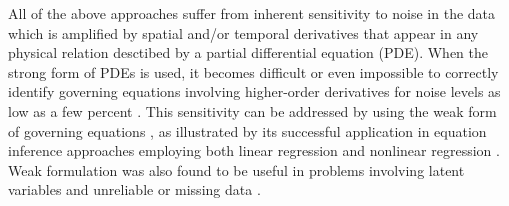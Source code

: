\documentclass[preprint]{article}
\begin{document}




All of the above approaches suffer from inherent sensitivity to noise in the data which is amplified by spatial and/or temporal derivatives that appear in any physical relation desctibed by a partial differential equation (PDE). When the strong form of PDEs is used, it becomes difficult or even impossible to correctly identify governing equations involving higher-order derivatives for noise levels as low as a few percent \citep{rudy2017,raissi2018,raissi2019}. This sensitivity can be addressed by using the weak form of governing equations \citep{gurevich2019}, as illustrated by its successful application in equation inference approaches employing both linear regression \citep{reinbold2020,messenger2021,alves2022} and nonlinear regression \citep{stephafny2023}. Weak formulation was also found to be useful in problems involving latent variables \citep{reinbold2021} and unreliable or missing data \citep{golden2023}.
\end{document}
